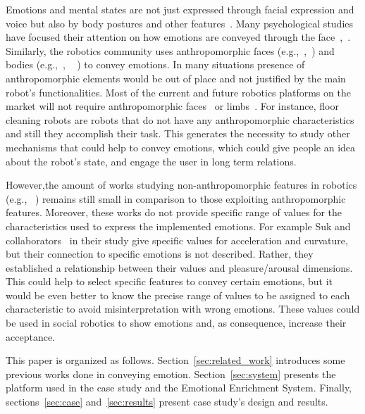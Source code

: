 Emotions and mental states are not just expressed through facial expression and voice but also by body postures and other features~\cite{Gelder2008}. Many psychological studies have focused their attention on how emotions are conveyed through the face~\cite{Ekman2004},~\cite{kleinsmith2012affective}. Similarly, the robotics community uses anthropomorphic faces (e.g.,~\cite{Arras2012},~\cite{Breazeal2002}) and bodies (e.g.,~\cite{Canamero2010},
~\cite{Destephe2013}
) to convey emotions.
In many situations presence of anthropomorphic elements would be out of place and not justified by the main robot's functionalities. Most of the current and future robotics platforms on the market will not require anthropomorphic faces~\cite{Breazeal2002} or limbs~\cite{Li2011}. For instance, floor cleaning robots are robots that do not have any anthropomorphic characteristics and still they accomplish their task.
This generates the necessity to study other mechanisms that could help to convey emotions, which could give people an idea about the robot's state, and engage the user in long term relations.

However,the amount of works studying non-anthropomorphic features in robotics (e.g.,~\cite{Saerbeck2010}
) remains still small in comparison to those exploiting anthropomorphic features. Moreover, these works do not provide specific range of values for the characteristics used to express the implemented emotions. For example Suk and collaborators~\cite{NAM2014} in their study give specific values for acceleration and curvature, but their connection to specific emotions is not described. Rather, they established a relationship between their values and pleasure/arousal dimensions. This could help to select specific features to convey certain emotions, but it would be even better to know the precise range of values to be assigned to each characteristic to avoid misinterpretation with wrong emotions. These values could be used in social robotics to show emotions and, as consequence, increase their acceptance.

This paper is organized as follows. Section~\ref{sec:related_work} introduces some previous works done in conveying emotion. Section~\ref{sec:system} presents the platform used in the case study and the Emotional Enrichment System. Finally, sections~\ref{sec:case} and~\ref{sec:results} present case study's design and results.
